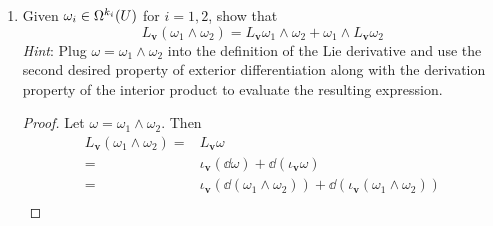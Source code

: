 \documentclass[../psets.tex]{subfiles}
\begin{document}
\begin{enumerate}[label={\textbf{2.5.\roman*.}}]
\begin{proof}
        Let $\omega\in\ome[k]{U}$ be arbitrary. Then
        \begin{align*}
            \dd(L_{\bm{v}}\omega) &= \dd(\iota_{\bm{v}}(\dd\omega)+\dd(\iota_{\bm{v}}\omega))&
                \iota_{\bm{v}}(L_{\bm{v}}\omega) &= \iota_{\bm{v}}(\iota_{\bm{v}}(\dd\omega)+\dd(\iota_{\bm{v}}\omega))\\
            &= \dd(\iota_{\bm{v}}(\dd\omega))+\dd(\dd(\iota_{\bm{v}}\omega))&
                &= \iota_{\bm{v}}(\iota_{\bm{v}}(\dd\omega))+\iota_{\bm{v}}(\dd(\iota_{\bm{v}}\omega))\\
            &= \dd(\iota_{\bm{v}}(\dd\omega))+0&
                &= 0+\iota_{\bm{v}}(\dd(\iota_{\bm{v}}\omega))\\
            &= 0+\dd(\iota_{\bm{v}}(\dd\omega))&
                &= \iota_{\bm{v}}(\dd(\iota_{\bm{v}}\omega))+0\\
            &= \iota_{\bm{v}}(0)+\dd(\iota_{\bm{v}}(\dd\omega))&
                &= \iota_{\bm{v}}(\dd(\iota_{\bm{v}}\omega))+\dd(0)\\
            &= \iota_{\bm{v}}(\dd(\dd\omega))+\dd(\iota_{\bm{v}}(\dd\omega))&
                &= \iota_{\bm{v}}(\dd(\iota_{\bm{v}}\omega))+\dd(\iota_{\bm{v}}(\iota_{\bm{v}}\omega))\\
            &= L_{\bm{v}}(\dd\omega)&
                &= L_{\bm{v}}(\iota_{\bm{v}}\omega)
        \end{align*}
        as desired.
    \end{proof}
    \item Given $\omega_i\in\ome[k_i]{U}$ for $i=1,2$, show that
    \begin{equation*}
        L_{\bm{v}}(\omega_1\wedge\omega_2) = L_{\bm{v}}\omega_1\wedge\omega_2+\omega_1\wedge L_{\bm{v}}\omega_2
    \end{equation*}
    \emph{Hint}: Plug $\omega=\omega_1\wedge\omega_2$ into the definition of the Lie derivative and use the second desired property of exterior differentiation along with the derivation property of the interior product to evaluate the resulting expression.
    \begin{proof}
        Let $\omega=\omega_1\wedge\omega_2$. Then
        \begin{align*}
            L_{\bm{v}}(\omega_1\wedge\omega_2) ={}& L_{\bm{v}}\omega\\
            ={}& \iota_{\bm{v}}(\dd\omega)+\dd(\iota_{\bm{v}}\omega)\\
            ={}& \iota_{\bm{v}}(\dd(\omega_1\wedge\omega_2))+\dd(\iota_{\bm{v}}(\omega_1\wedge\omega_2))\\

\end{align*}
\end{proof}
\end{enumerate}
\end{document}
